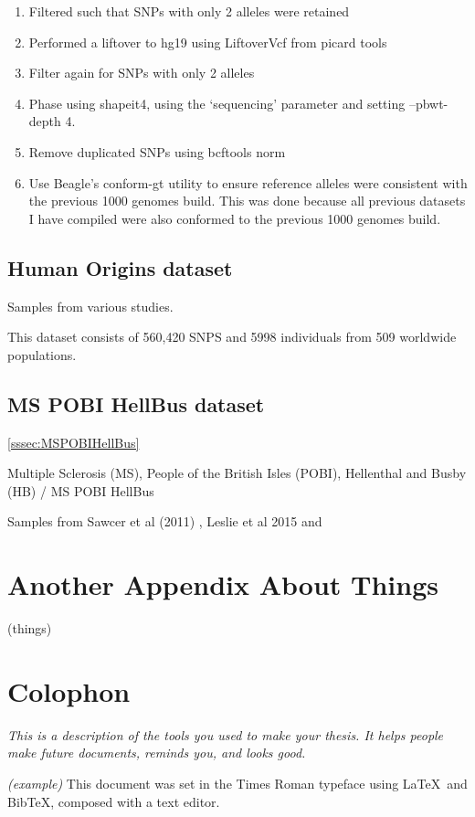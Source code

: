 \begin{enumerate}
\item Filtered such that SNPs with only 2 alleles were retained
\item Performed a liftover to hg19 using LiftoverVcf from picard tools \cite{Picard2018toolkit}
\item Filter again for SNPs with only 2 alleles
\item Phase using shapeit4, using the `sequencing' parameter and setting --pbwt-depth 4.
\item Remove duplicated SNPs using bcftools norm \cite{li2009sequence} 
\item Use Beagle's conform-gt utility to ensure reference alleles were consistent with the previous 1000 genomes build. This was done because all previous datasets I have compiled were also conformed to the previous 1000 genomes build. 
\end{enumerate}

\section{Human Origins dataset}

Samples from various studies. 

This dataset consists of 560,420 SNPS and 5998 individuals from 509 worldwide populations. 

\section{MS POBI HellBus dataset}
\ref{sssec:MSPOBIHellBus}


Multiple Sclerosis (MS), People of the British Isles (POBI), Hellenthal and Busby (HB) / MS POBI HellBus

Samples from Sawcer et al (2011) \cite{Sawcer2011}, Leslie et al 2015 \cite{Leslie2015} and 



\chapter{Another Appendix About Things}
\label{appendixlabel2}
(things)

\chapter{Colophon}
\label{appendixlabel3}
\textit{This is a description of the tools you used to make your thesis. It helps people make future documents, reminds you, and looks good.}

\textit{(example)} This document was set in the Times Roman typeface using \LaTeX\ and Bib\TeX , composed with a text editor. 

